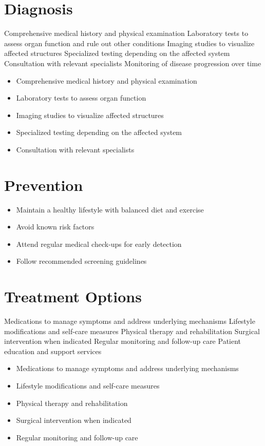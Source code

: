 \section{Diagnosis}
Comprehensive medical history and physical examination Laboratory tests to assess organ function and rule out other conditions Imaging studies to visualize affected structures Specialized testing depending on the affected system Consultation with relevant specialists Monitoring of disease progression over time

\begin{itemize}[noitemsep]
  \item Comprehensive medical history and physical examination
  \item Laboratory tests to assess organ function
  \item Imaging studies to visualize affected structures
  \item Specialized testing depending on the affected system
  \item Consultation with relevant specialists
\end{itemize}
\section{Prevention}
\begin{itemize}[noitemsep]
  \item Maintain a healthy lifestyle with balanced diet and exercise
  \item Avoid known risk factors
  \item Attend regular medical check-ups for early detection
  \item Follow recommended screening guidelines
\end{itemize}
\section{Treatment Options}
Medications to manage symptoms and address underlying mechanisms Lifestyle modifications and self-care measures Physical therapy and rehabilitation Surgical intervention when indicated Regular monitoring and follow-up care Patient education and support services

\begin{itemize}[noitemsep]
  \item Medications to manage symptoms and address underlying mechanisms
  \item Lifestyle modifications and self-care measures
  \item Physical therapy and rehabilitation
  \item Surgical intervention when indicated
  \item Regular monitoring and follow-up care
\end{itemize}

